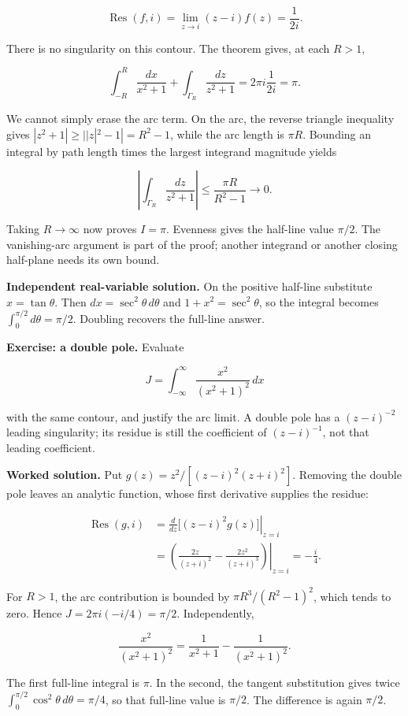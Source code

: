 \[
\operatorname{Res}(f,i)
=\lim_{z\to i}(z-i)f(z)
=\frac{1}{2i}.
\]

There is no singularity on this contour. The theorem gives, at each \(R>1\),

\[
\int_{-R}^{R}\frac{dx}{x^2+1}
+\int_{\Gamma_R}\frac{dz}{z^2+1}
=2\pi i\frac{1}{2i}=\pi.
\]

We cannot simply erase the arc term. On the arc, the reverse triangle inequality gives \(|z^2+1|\geq ||z|^2-1|=R^2-1\), while the arc length is \(\pi R\). Bounding an integral by path length times the largest integrand magnitude yields

\[
\left|\int_{\Gamma_R}\frac{dz}{z^2+1}\right|
\leq\frac{\pi R}{R^2-1}\longrightarrow0.
\]

Taking \(R\to\infty\) now proves \(I=\pi\). Evenness gives the half-line value \(\pi/2\). The vanishing-arc argument is part of the proof; another integrand or another closing half-plane needs its own bound.

\textbf{Independent real-variable solution.} On the positive half-line substitute \(x=\tan\theta\). Then \(dx=\sec^2\theta\,d\theta\) and \(1+x^2=\sec^2\theta\), so the integral becomes \(\int_0^{\pi/2}d\theta=\pi/2\). Doubling recovers the full-line answer.

\textbf{Exercise: a double pole.} Evaluate

\[
J=\int_{-\infty}^{\infty}\frac{x^2}{(x^2+1)^2}\,dx
\]

with the same contour, and justify the arc limit. A double pole has a \((z-i)^{-2}\) leading singularity; its residue is still the coefficient of \((z-i)^{-1}\), not that leading coefficient.

\textbf{Worked solution.} Put \(g(z)=z^2/[(z-i)^2(z+i)^2]\). Removing the double pole leaves an analytic function, whose first derivative supplies the residue:

\[
\begin{aligned}
\operatorname{Res}(g,i)
&=\left.\frac{d}{dz}\big[(z-i)^2g(z)\big]\right|_{z=i}\\
&=\left.\left(\frac{2z}{(z+i)^2}-\frac{2z^2}{(z+i)^3}\right)\right|_{z=i}
=-\frac{i}{4}.
\end{aligned}
\]

For \(R>1\), the arc contribution is bounded by \(\pi R^3/(R^2-1)^2\), which tends to zero. Hence \(J=2\pi i(-i/4)=\pi/2\). Independently,

\[
\frac{x^2}{(x^2+1)^2}=\frac{1}{x^2+1}-\frac{1}{(x^2+1)^2}.
\]

The first full-line integral is \(\pi\). In the second, the tangent substitution gives twice \(\int_0^{\pi/2}\cos^2\theta\,d\theta=\pi/4\), so that full-line value is \(\pi/2\). The difference is again \(\pi/2\).

